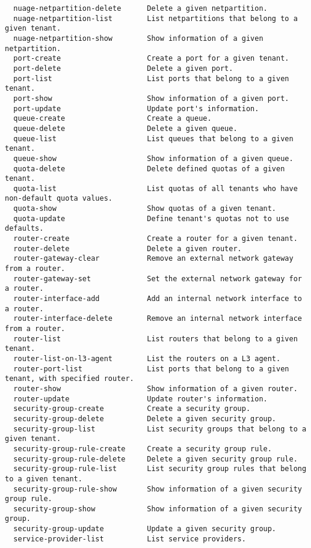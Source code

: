 \documentclass[a4paper,left=1.5cm,right=1.5cm,11pt]{article}
\begin{document}
\begin{lstlisting}
  nuage-netpartition-delete      Delete a given netpartition.
  nuage-netpartition-list        List netpartitions that belong to a given tenant.
  nuage-netpartition-show        Show information of a given netpartition.
  port-create                    Create a port for a given tenant.
  port-delete                    Delete a given port.
  port-list                      List ports that belong to a given tenant.
  port-show                      Show information of a given port.
  port-update                    Update port's information.
  queue-create                   Create a queue.
  queue-delete                   Delete a given queue.
  queue-list                     List queues that belong to a given tenant.
  queue-show                     Show information of a given queue.
  quota-delete                   Delete defined quotas of a given tenant.
  quota-list                     List quotas of all tenants who have non-default quota values.
  quota-show                     Show quotas of a given tenant.
  quota-update                   Define tenant's quotas not to use defaults.
  router-create                  Create a router for a given tenant.
  router-delete                  Delete a given router.
  router-gateway-clear           Remove an external network gateway from a router.
  router-gateway-set             Set the external network gateway for a router.
  router-interface-add           Add an internal network interface to a router.
  router-interface-delete        Remove an internal network interface from a router.
  router-list                    List routers that belong to a given tenant.
  router-list-on-l3-agent        List the routers on a L3 agent.
  router-port-list               List ports that belong to a given tenant, with specified router.
  router-show                    Show information of a given router.
  router-update                  Update router's information.
  security-group-create          Create a security group.
  security-group-delete          Delete a given security group.
  security-group-list            List security groups that belong to a given tenant.
  security-group-rule-create     Create a security group rule.
  security-group-rule-delete     Delete a given security group rule.
  security-group-rule-list       List security group rules that belong to a given tenant.
  security-group-rule-show       Show information of a given security group rule.
  security-group-show            Show information of a given security group.
  security-group-update          Update a given security group.
  service-provider-list          List service providers.

\end{lstlisting}
\end{document}
